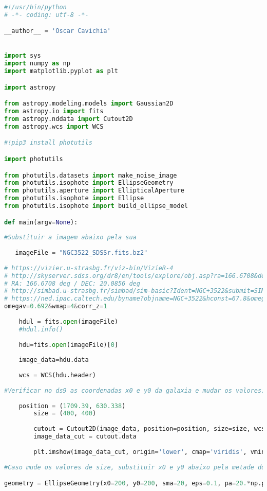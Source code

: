 \documentclass[a4paper, 11pt, fleqn, leqno]{article}
\begin{document}
\small{
\begin{lstlisting}[language=Python]
	
#!/usr/bin/python
# -*- coding: utf-8 -*-

__author__ = 'Oscar Cavichia'


import sys
import numpy as np
import matplotlib.pyplot as plt

import astropy

from astropy.modeling.models import Gaussian2D
from astropy.io import fits
from astropy.nddata import Cutout2D
from astropy.wcs import WCS

#!pip3 install photutils

import photutils

from photutils.datasets import make_noise_image
from photutils.isophote import EllipseGeometry
from photutils.aperture import EllipticalAperture
from photutils.isophote import Ellipse
from photutils.isophote import build_ellipse_model

def main(argv=None):
    
#Substituir a imagem abaixo pela sua
  
   imageFile = "NGC3522_SDSSr.fits.bz2"
	
# https://vizier.u-strasbg.fr/viz-bin/VizieR-4
# http://skyserver.sdss.org/dr8/en/tools/explore/obj.asp?ra=166.6708&dec=20.0856
# RA: 166.6708 deg / DEC: 20.0856 deg
# http://simbad.u-strasbg.fr/simbad/sim-basic?Ident=NGC+3522&submit=SIMBAD+search
# https://ned.ipac.caltech.edu/byname?objname=NGC+3522&hconst=67.8&omegam=0.308&
omegav=0.692&wmap=4&corr_z=1
    
    hdul = fits.open(imageFile)
    #hdul.info()
    
    hdu=fits.open(imageFile)[0]
    
    image_data=hdu.data
    
    wcs = WCS(hdu.header)
    
#Verificar no ds9 as coordenadas x0 e y0 da galaxia e mudar os valores:
    
    position = (1709.39, 630.338)
    	size = (400, 400)
    
    	cutout = Cutout2D(image_data, position=position, size=size, wcs=wcs)
    	image_data_cut = cutout.data
    
    	plt.imshow(image_data_cut, origin='lower', cmap='viridis', vmin=0,vmax=1)
    
#Caso mude os valores de size, substituir x0 e y0 abaixo pela metade dos valores

geometry = EllipseGeometry(x0=200, y0=200, sma=20, eps=0.1, pa=20.*np.pi/180.)


\end{lstlisting}}
\end{document}
